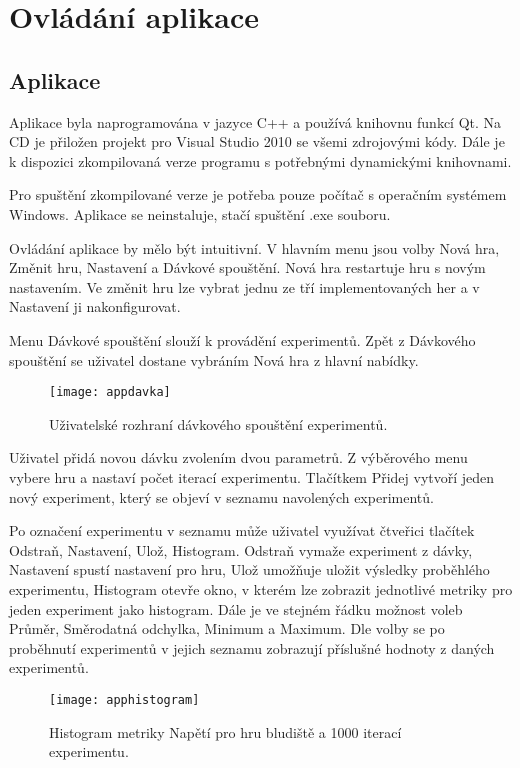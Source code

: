 \chapter{Ovládání aplikace}

\section{Aplikace}

Aplikace byla naprogramována v jazyce C++ a používá knihovnu funkcí Qt. Na CD je přiložen projekt pro Visual Studio 2010 se všemi zdrojovými kódy. Dále je k dispozici zkompilovaná verze programu s potřebnými dynamickými knihovnami.

Pro spuštění zkompilované verze je potřeba pouze počítač s operačním systémem Windows. Aplikace se neinstaluje, stačí spuštění .exe souboru.

Ovládání aplikace by mělo být intuitivní. V hlavním menu jsou volby Nová hra, Změnit hru, Nastavení a Dávkové spouštění. Nová hra restartuje hru s novým nastavením. Ve změnit hru lze vybrat jednu ze tří implementovaných her a v Nastavení ji nakonfigurovat.

Menu Dávkové spouštění slouží k provádění experimentů. Zpět z Dávkového spouštění se uživatel dostane vybráním Nová hra z hlavní nabídky.


\begin{figure}
  \centering
  \texttt{[image: appdavka]}
	\caption{Uživatelské rozhraní dávkového spouštění experimentů. }
	\label{fig-appdavka}
\end{figure}

Uživatel přidá novou dávku zvolením dvou parametrů. Z výběrového menu vybere hru a nastaví počet iterací experimentu. Tlačítkem Přidej vytvoří jeden nový experiment, který se objeví v seznamu navolených experimentů. 

Po označení experimentu v seznamu může uživatel využívat čtveřici tlačítek Odstraň, Nastavení, Ulož, Histogram. Odstraň vymaže experiment z dávky, Nastavení spustí nastavení pro hru, Ulož umožňuje uložit výsledky proběhlého experimentu, Histogram otevře okno, v kterém lze zobrazit jednotlivé metriky pro jeden experiment jako histogram. Dále je ve stejném řádku možnost voleb Průměr, Směrodatná odchylka, Minimum a Maximum. Dle volby se po proběhnutí experimentů v jejich seznamu zobrazují příslušné hodnoty z daných experimentů. 


\begin{figure}
  \centering
  \texttt{[image: apphistogram]}
	\caption{Histogram metriky Napětí pro hru bludiště a 1000 iterací experimentu. }
	\label{fig-apphistogram}
\end{figure}


